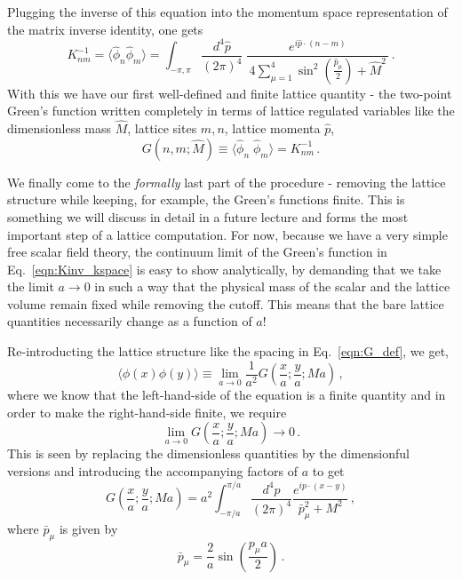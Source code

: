 \documentclass[11pt]{article}
\newcommand{\sidefact}[1]{\marginnote{\footnotesize\textcolor{green!50!black}{#1}}}
\newcommand{\sideex}[1]{\marginnote{\footnotesize\textcolor{red!50!black}{#1}}}
\theoremstyle{definition}
\begin{document}
Plugging the inverse of this equation into the momentum space representation of the matrix inverse identity, one gets \sideex{It would be a nice exercise to show this!}
\begin{equation}\label{eqn:Kinv_kspace}
  K^{-1}_{nm}=\langle \hat{\phi}_n \hat{\phi}_m \rangle
  =\int_{-\pi,\pi} \!\frac{d^4 \hat{p}}{(2\pi)^4}\;\frac{e^{i \hat{p}\cdot (n-m)}}{\,4\displaystyle\sum_{\mu=1}^4 \sin^2\!\left(\tfrac{\hat{p}_\mu}{2}\right)+\hat{M}^2\,}\,.
\end{equation}
With this we have our first well-defined and finite lattice quantity - the two-point Green's function written completely in terms of lattice regulated variables like the dimensionless mass $\hat{M}$, lattice sites $m,n$, lattice momenta $\hat{p}$,
\begin{equation}\label{eqn:G_def}
  G(n,m;\hat{M}) \equiv \langle \hat{\phi}_n \;\hat{\phi}_m \rangle = K^{-1}_{nm} \,.
\end{equation}

We finally come to the \textit{formally} last part of the procedure - removing the lattice structure while keeping, for example, the Green's functions finite. This is something we will discuss in detail in a future lecture and forms the most important step of a lattice computation. \sidefact{However, if you start reading LFT research papers you will see that it is not very common to find that someone actually takes the continuum limit in their calculations - most lattice physicists just simulate one large and fine lattice and publish their results.}
For now, because we have a very simple free scalar field theory, the continuum limit of the Green's function in Eq.~\eqref{eqn:Kinv_kspace} is easy to show analytically, by demanding that we take the limit $a \to 0$ in such a way that the physical mass of the scalar and the lattice volume remain fixed while removing the cutoff. This means that the bare lattice quantities necessarily change as a function of $a$!

Re-introducting the lattice structure like the spacing in Eq.~\eqref{eqn:G_def}, we get,
\begin{equation}\label{eqn:Gdef_a}
\langle \phi(x)\phi(y) \rangle \equiv \lim_{a \to 0} \frac{1}{a^2} G\left(\frac{x}{a};\frac{y}{a}; M a\right)\,,
\end{equation}
where we know that the left-hand-side of the equation is a finite quantity and in order to make the right-hand-side finite, we require
\begin{equation}
  \lim_{a \to 0} G\left(\frac{x}{a};\frac{y}{a}; M a\right) \to 0 \,.
\end{equation}
This is seen by replacing the dimensionless quantities by the dimensionful versions and introducing the accompanying factors of $a$ to get
\begin{equation}\label{eqn:G_with_a}
G\left(\frac{x}{a};\frac{y}{a}; M a\right) = a^2 \int_{-\pi/a}^{\pi/a} \frac{d^4 p}{(2\pi)^4} \frac{e^{i p \cdot (x-y)}}{\bar{p}_\mu^2 + M^2}\,,
\end{equation}
where $\bar{p}_\mu$ is given by
\begin{equation}\label{eqn:latt_mom}
\bar{p}_\mu = \frac{2}{a} \sin\left(\frac{p_\mu a}{2}\right)\,.
\end{equation}
\end{document}
